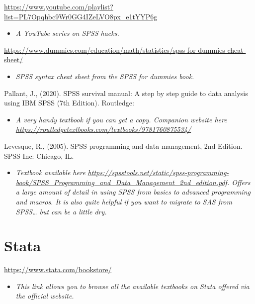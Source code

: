 \documentclass[
]{book}
\providecommand{\tightlist}{%
  \setlength{\itemsep}{0pt}\setlength{\parskip}{0pt}}
\begin{document}
\url{https://www.youtube.com/playlist?list=PL7Opqhbc9Wr0GG4IZeLVO8px_e1tYYP6g}

\begin{itemize}
\tightlist
\item
  \emph{A YouTube series on SPSS hacks.}
\end{itemize}

\url{https://www.dummies.com/education/math/statistics/spss-for-dummies-cheat-sheet/}

\begin{itemize}
\tightlist
\item
  \emph{SPSS syntax cheat sheet from the SPSS for dummies book. }
\end{itemize}

Pallant, J., (2020). SPSS survival manual: A step by step guide to data analysis using IBM SPSS (7th Edition). Routledge:

\begin{itemize}
\tightlist
\item
  \emph{A very handy textbook if you can get a copy. Companion website here \url{https://routledgetextbooks.com/textbooks/9781760875534/}}
\end{itemize}

Levesque, R., (2005). SPSS programming and data management, 2nd Edition. SPSS Inc: Chicago, IL.

\begin{itemize}
\tightlist
\item
  \emph{Textbook available here \url{https://spsstools.net/static/spss-programming-book/SPSS_Programming_and_Data_Management_2nd_edition.pdf}. Offers a large amount of detail in using SPSS from basics to advanced programming and macros. It is also quite helpful if you want to migrate to SAS from SPSS\ldots{} but can be a little dry.}
\end{itemize}

\hypertarget{stata}{%
\section{Stata}\label{stata}}

\url{https://www.stata.com/bookstore/}

\begin{itemize}
\tightlist
\item
  \emph{This link allows you to browse all the available textbooks on Stata offered via the official website.}
\end{itemize}
\end{document}
